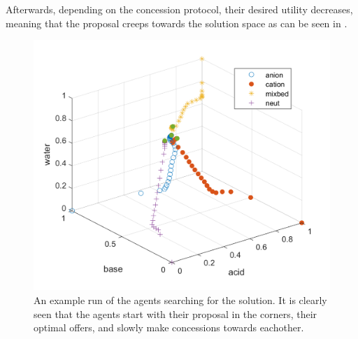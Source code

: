 Afterwards, depending on the concession protocol, their desired utility decreases, meaning that the proposal creeps towards the solution space as can be seen in . 
\begin{figure}[h]
	\centering
	\includegraphics[width=0.7\linewidth]{img/searchforsolution}
	\caption{An example run of the agents searching for the solution. It is clearly seen that the agents start with their proposal in the corners, their optimal offers, and slowly make concessions towards eachother.}
	\label{fig:searchforsolution}
\end{figure}

